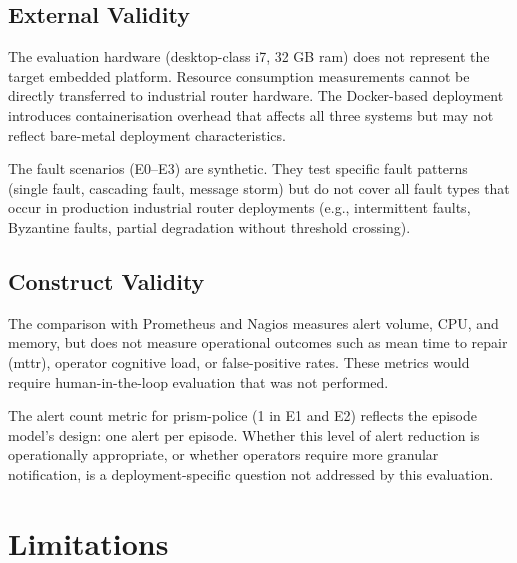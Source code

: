 \subsection{External Validity}

The evaluation hardware (desktop-class i7, 32 GB \gls{ram}) does not represent the target embedded platform. Resource consumption measurements cannot be directly transferred to industrial router hardware. The Docker-based deployment introduces containerisation overhead that affects all three systems but may not reflect bare-metal deployment characteristics.

The fault scenarios (E0--E3) are synthetic. They test specific fault patterns (single fault, cascading fault, message storm) but do not cover all fault types that occur in production industrial router deployments (e.g., intermittent faults, Byzantine faults, partial degradation without threshold crossing).

\subsection{Construct Validity}

The comparison with Prometheus and Nagios measures alert volume, CPU, and memory, but does not measure operational outcomes such as mean time to repair (\gls{mttr}), operator cognitive load, or false-positive rates. These metrics would require human-in-the-loop evaluation that was not performed.

The alert count metric for prism-police (1 in E1 and E2) reflects the episode model's design: one alert per episode. Whether this level of alert reduction is operationally appropriate, or whether operators require more granular notification, is a deployment-specific question not addressed by this evaluation.

\section{Limitations}\label{sec:eval-limitations}


